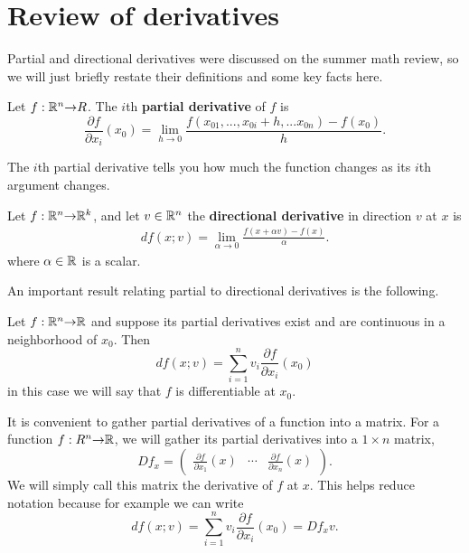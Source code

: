 \section{Review of derivatives \label{sec:derivatives}}
Partial and directional derivatives were discussed on the summer math
review, so we will just briefly restate their definitions and some key
facts here.
\begin{definition}
  Let $f:\mathbb{R}^n {\rightarrow} R$. The $i$th \textbf{partial derivative} of $f$
  is
  \[ \frac{\partial f}{\partial x_i} (x_0) = \lim_{h \to 0}
  \frac{f(x_{01},...,x_{0i}+h, ... x_{0n}) - f(x_0) }{h}. \]
\end{definition}
The $i$th partial derivative tells you how much the function changes
as its $i$th argument changes. 
\begin{definition}
  Let $f: \mathbb{R}^n {\rightarrow} \mathbb{R}^k$, and let $v \in \mathbb{R}^n$ the \textbf{directional
    derivative} in direction $v$ at $x$ is
  \begin{align*}
    df(x;v) = \lim_{\alpha \to 0} \frac{f(x + \alpha v) - f(x)}{\alpha}.
  \end{align*}  
  where $\alpha \in \mathbb{R}$ is a scalar.
\end{definition}
An important result relating partial to directional derivatives is the
following.
\begin{theorem}\label{thm:pddiff}
  Let $f:\mathbb{R}^n {\rightarrow} \mathbb{R}$ and suppose its partial derivatives exist and
  are continuous in a neighborhood of $x_0$. Then
  \[ df(x;v) = \sum_{i=1}^n v_i \frac{\partial f}{\partial x_i}
  (x_0) \]
  in this case we will say that $f$ is differentiable at $x_0$.
\end{theorem}

It is convenient to gather partial derivatives of a function into a
matrix. For a function $f: R^n {\rightarrow} \mathbb{R}$, we will gather its partial
derivatives into a $1 \times n$ matrix, 
\[ Df_x = \begin{pmatrix} \frac{\partial f}{\partial x_1}(x) & \cdots
  & \frac{\partial f}{\partial x_n}(x)
\end{pmatrix}. \]
We will simply call this matrix the derivative of $f$ at $x$. This
helps reduce notation because for example we can write
\[ df(x;v) = \sum_{i=1}^n v_i \frac{\partial f}{\partial x_i}
(x_0) = Df_x v. \]


